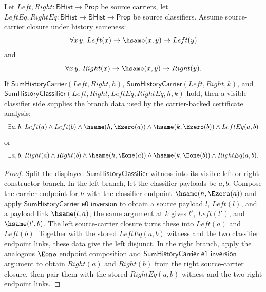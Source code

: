 \begin{theorem}
\label{thm:sum-history-classifier-carrier-aware-branch-partition}
Let $Left,Right:\mathsf{BHist}\to\mathsf{Prop}$ be source carriers, let
$LeftEq,RightEq:\mathsf{BHist}\to\mathsf{BHist}\to\mathsf{Prop}$ be source
classifiers. Assume source-carrier closure under history sameness:
$$
\forall x\,y.\; Left(x)\to \hsame(x,y)\to Left(y)
$$
and
$$
\forall x\,y.\; Right(x)\to \hsame(x,y)\to Right(y).
$$
If $\mathsf{SumHistoryCarrier}(Left,Right,h)$,
$\mathsf{SumHistoryCarrier}(Left,Right,k)$, and
$\mathsf{SumHistoryClassifier}(Left,Right,LeftEq,RightEq,h,k)$ hold, then a
visible classifier side supplies the branch data used by the carrier-backed
certificate analysis:
$$
\begin{array}{l}
\exists a,b.\; Left(a)\land Left(b)\land
\hsame(h,\Ezero(a))\land \hsame(k,\Ezero(b))\land LeftEq(a,b)
\end{array}
$$
or
$$
\begin{array}{l}
\exists a,b.\; Right(a)\land Right(b)\land
\hsame(h,\Eone(a))\land \hsame(k,\Eone(b))\land RightEq(a,b).
\end{array}
$$
\end{theorem}
\begin{proof}
Split the displayed $\mathsf{SumHistoryClassifier}$ witness into its visible
left or right constructor branch. In the left branch, let the classifier
payloads be $a,b$. Compose the carrier endpoint for $h$ with the classifier
endpoint $\hsame(h,\Ezero(a))$ and apply
$\mathsf{SumHistoryCarrier\_e0\_inversion}$ to obtain a source payload $l$,
$Left(l)$, and a payload link $\hsame(l,a)$; the same argument at $k$ gives
$l'$, $Left(l')$, and $\hsame(l',b)$. The left source-carrier closure turns
these into $Left(a)$ and $Left(b)$. Together with the stored $LeftEq(a,b)$
witness and the two classifier endpoint links, these data give the left
disjunct. In the right branch, apply the analogous $\Eone$ endpoint
composition and $\mathsf{SumHistoryCarrier\_e1\_inversion}$ argument to obtain
$Right(a)$ and $Right(b)$ from the right source-carrier closure, then pair them
with the stored $RightEq(a,b)$ witness and the two right endpoint links.
\end{proof}

